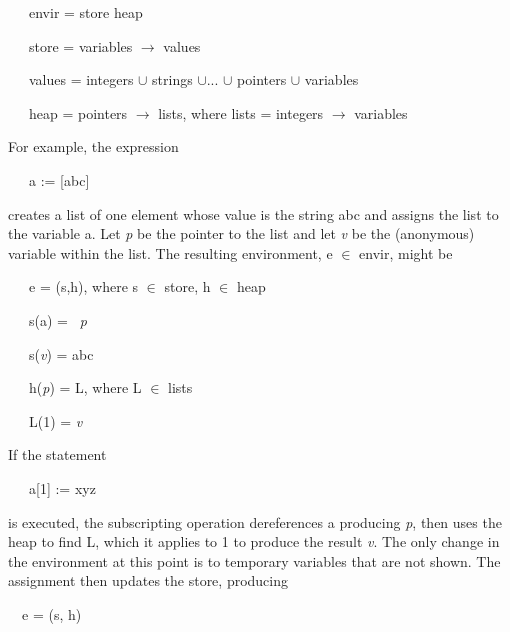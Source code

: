 {\ttfamily\mdseries
\ \ \ envir\TextSubscript{[1]} = store\TextSubscript{[1]} {\texttimes} heap\TextSubscript{[1]}}

{\ttfamily\mdseries
\ \ \ store\TextSubscript{[1]} = variables \textrm{${\rightarrow}$ }values}

{\ttfamily\mdseries
\ \ \ values = integers \textrm{${\cup}$} strings \textrm{${\cup}$}... \textrm{${\cup}$} pointers \textrm{${\cup}$}
variables}

{\ttfamily\mdseries
\ \ \ heap\TextSubscript{[1]} = pointers \textrm{${\rightarrow}$} lists, where lists = integers \textrm{${\rightarrow}$}
variables}


For example, the expression 

{\ttfamily\mdseries
\ \ \ a := [{\textquotedbl}abc{\textquotedbl}]}

\noindent creates a list of one element whose value is the string abc
and assigns the list to the variable a. Let
\textit{p}\textit{} be the pointer to the list and
let \textit{v}\textit{} be the (anonymous) variable
within the list. The resulting environment, e ${\in}$
envir\TextSubscript{[1]}, might be

{\ttfamily\mdseries
\ \ \ e = (s,h), where s \textrm{${\in}$} store\TextSubscript{[1]}, h \textrm{${\in}$} heap\TextSubscript{[1]}}

{\ttfamily\mdseries
\ \ \ s(a) = \ \textit{p}\textit{}}

{\ttfamily\mdseries
\ \ \ s(\textit{v}\textit{}) = {\textquotedbl}abc{\textquotedbl}}

{\ttfamily\mdseries
\ \ \ h(\textit{p}\textit{}) = L, where L \textrm{${\in}$} lists}

{\ttfamily\mdseries
\ \ \ L(1) = \textit{v}\textit{}}


If the statement 

{\ttfamily\mdseries
\ \ \ a[1] := {\textquotedbl}xyz{\textquotedbl}}

\noindent is executed, the subscripting operation dereferences a
producing \textit{p}\textit{}, then uses the heap to
find L, which it applies to 1 to produce the result
\textit{v}\textit{}. The only change in the
environment at this point is to temporary variables that are not
shown. The assignment then updates the store, producing

{\ttfamily\mdseries
\ \ e = (s, h)}

